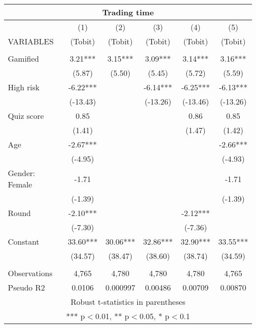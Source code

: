 \documentclass[]{article}
\begin{document}
\begin{tabular}{lccccc}
\multicolumn{6}{c}{Trading time} \\ \hline
 & (1) & (2) & (3) & (4) & (5) \\
VARIABLES & (Tobit) & (Tobit) & (Tobit) & (Tobit) & (Tobit) \\ \hline
 &  &  &  &  &  \\
Gamified & 3.21*** & 3.15*** & 3.09*** & 3.14*** & 3.16*** \\
 & (5.87) & (5.50) & (5.45) & (5.72) & (5.59) \\
High risk & -6.22*** &  & -6.14*** & -6.25*** & -6.13*** \\
 & (-13.43) &  & (-13.26) & (-13.46) & (-13.26) \\
Quiz score & 0.85 &  &  & 0.86 & 0.85 \\
 & (1.41) &  &  & (1.47) & (1.42) \\
Age & -2.67*** &  &  &  & -2.66*** \\
 & (-4.95) &  &  &  & (-4.93) \\
Gender: Female & -1.71 &  &  &  & -1.71 \\
 & (-1.39) &  &  &  & (-1.39) \\
Round & -2.10*** &  &  & -2.12*** &  \\
 & (-7.30) &  &  & (-7.36) &  \\
Constant & 33.60*** & 30.06*** & 32.86*** & 32.90*** & 33.55*** \\
 & (34.57) & (38.47) & (38.60) & (38.74) & (34.59) \\
 &  &  &  &  &  \\
Observations & 4,765 & 4,780 & 4,780 & 4,780 & 4,765 \\
 Pseudo R2 & 0.0106 & 0.000997 & 0.00486 & 0.00709 & 0.00870 \\ \hline
\multicolumn{6}{c}{ Robust t-statistics in parentheses} \\
\multicolumn{6}{c}{ *** p$<$0.01, ** p$<$0.05, * p$<$0.1} \\
\end{tabular}
\end{document}
